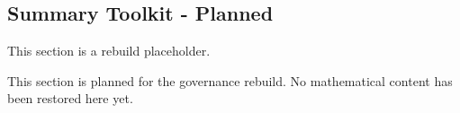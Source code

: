 \subsection*{Summary Toolkit - Planned}
\begin{exposition}
This section is a rebuild placeholder.
\end{exposition}

\begin{exposition}
This section is planned for the governance rebuild. No mathematical content has
been restored here yet.
\end{exposition}
